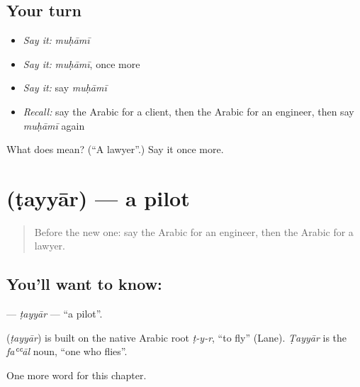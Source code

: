 \subsection*{Your turn}
\begin{itemize}
\raggedright
  \item \emph{Say it:} \emph{muḥāmī}
  \item \emph{Say it:} \emph{muḥāmī}, once more
  \item \emph{Say it:} say \emph{muḥāmī}
  \item \emph{Recall:} say the Arabic for a client, then the Arabic for an engineer, then say \emph{muḥāmī} again
\end{itemize}

\begin{tcolorbox}[breakable,colback=teal!4,colframe=teal!35!black,title={Before you move on}]
What does  mean? (\textquotedblleft{}A lawyer\textquotedblright{}.) Say it once more.
\end{tcolorbox}
\section[\texorpdfstring{\ar{طيار} (ṭayyār)}{طيار (ṭayyār)}]{ (ṭayyār) — a pilot}

\label{lesson:AR-C280-tayyar}



\begin{quote}
Before the new one: say the Arabic for an engineer, then the Arabic for a lawyer.
\end{quote}

\subsection*{You'll want to know: }
\textbf{} — \emph{ṭayyār} — \textquotedblleft{}a pilot\textquotedblright{}.

\begin{cousinweb}
\textbf{} (\emph{ṭayyār}) is built on the native Arabic root \emph{ṭ-y-r}, \textquotedblleft{}to fly\textquotedblright{} (Lane). \emph{Ṭayyār} is the \emph{faʿʿāl} noun, \textquotedblleft{}one who flies\textquotedblright{}.
\end{cousinweb}

\begin{grammarlens}[title={What you've built}]
One more word for this chapter.
\end{grammarlens}

